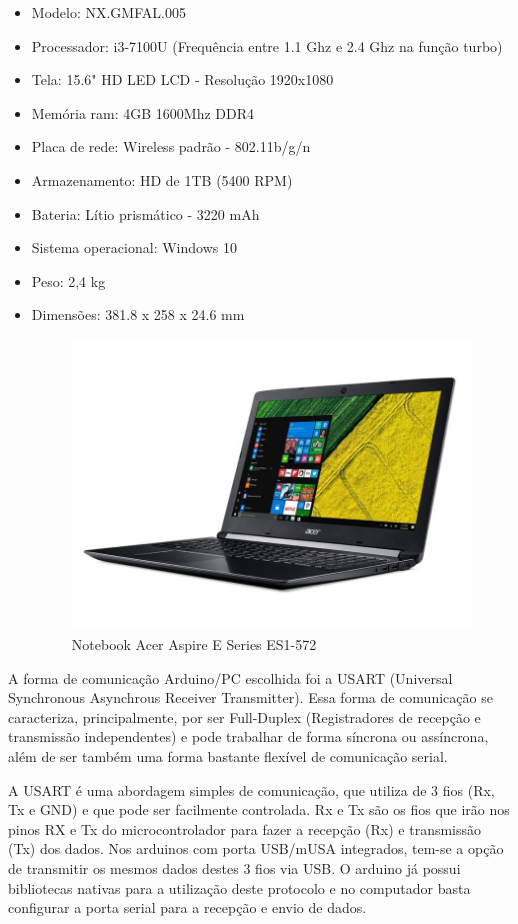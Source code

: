 \begin{itemize}[noitemsep]
\item Modelo: NX.GMFAL.005
\item Processador: i3-7100U (Frequência entre 1.1 Ghz e 2.4 Ghz na função turbo)
\item Tela: 15.6" HD LED LCD - Resolução 1920x1080
\item Memória ram: 4GB 1600Mhz DDR4
\item Placa de rede: Wireless padrão - 802.11b/g/n
\item Armazenamento: HD de 1TB (5400 RPM)
\item Bateria: Lítio prismático - 3220 mAh
\item Sistema operacional: Windows 10
\item Peso: 2,4 kg
\item Dimensões: 381.8 x 258 x 24.6 mm
\begin{figure}[H]
	\centering	\includegraphics[keepaspectratio=true,scale=0.3]{figuras/acer_note.jpg}
	\caption{Notebook Acer Aspire E Series ES1-572 \cite{notebook1}}
	\label{acer_note}
\end{figure}
\end{itemize}

A forma de comunicação Arduino/PC escolhida foi a USART (Universal Synchronous Asynchrous Receiver Transmitter). Essa forma de comunicação se caracteriza, principalmente, por ser Full-Duplex (Registradores de recepção e transmissão independentes) e pode trabalhar de forma síncrona ou assíncrona, além de ser também uma forma bastante flexível de comunicação serial.

A USART é uma abordagem simples de comunicação, que utiliza de 3 fios (Rx, Tx e GND) e que pode ser facilmente controlada. Rx e Tx são os fios que irão nos pinos RX e Tx do microcontrolador para fazer a recepção (Rx) e transmissão (Tx) dos dados. Nos arduinos com porta USB/mUSA integrados, tem-se a opção de transmitir os mesmos dados destes 3 fios via USB. O arduino já possui bibliotecas nativas para a utilização deste protocolo e no computador basta configurar a porta serial para a recepção e envio de dados.

